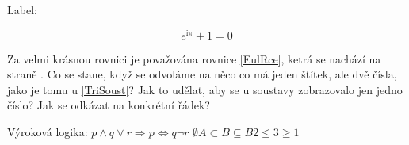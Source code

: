 \documentclass[a4paper, 12pt]{article}
\begin{document}
Label:

\begin{equation} \label{EulRce}
    e^{\mathrm{i} \pi} + 1 = 0
\end{equation}

Za velmi krásnou rovnici je považována rovnice \ref{EulRce}, ketrá se nachází na straně \pageref{EulRce}.
Co se stane, když se odvoláme na něco co má jeden štítek, ale dvě čísla, jako je tomu u \ref{TriSoust}?
Jak to udělat, aby se u soustavy zobrazovalo jen jedno číslo?
Jak se odkázat na konkrétní řádek?

Výroková logika:
$p \wedge q \vee r \Rightarrow p \Leftrightarrow q \neg r$
$ \emptyset A \subset B \subseteq B 2 \leq 3 \geq 1$
\end{document}
